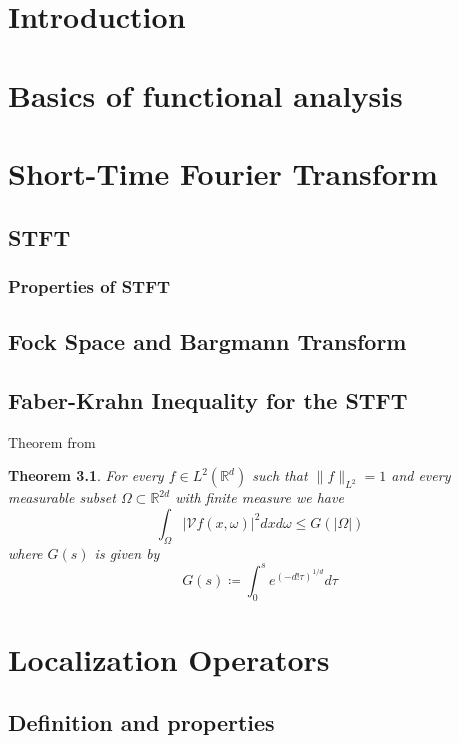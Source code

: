 \documentclass[corpo=11pt, stile=classica, tipotesi=custom,
greek, evenboxes, english]{toptesi}
\numberwithin{equation}{chapter}
\newtheorem{teo}{Theorem}[chapter] %
\newcommand{\R}{\mathbb{R}} %
\newcommand{\V}{\mathcal{V}} %
\newcommand{\dxdo}{dxd\omega}
\begin{document}
	


\tableofcontents

\sommario

\chapter{Introduction}

\chapter{Basics of functional analysis}

\chapter{Short-Time Fourier Transform}
\section{STFT}
\subsection{Properties of STFT}
\section{Fock Space and Bargmann Transform}
\section{Faber-Krahn Inequality for the STFT}

Theorem from \cite{nicolatilli_fk}
\begin{teo}\label{faberkrahn}
	For every $f \in L^2(\R^d)$ such that $\|f\|_{L^2} = 1$ and every measurable subset $\Omega \subset \R^{2d}$ with finite measure we have
	\begin{equation*}
		\int_{\Omega}  |\V f(x,\omega)|^2 \dxdo \leq G(|\Omega|)
	\end{equation*}
	where $G(s)$ is given by
	\begin{equation}\label{G}
		G(s) \coloneqq \int_0^s e^{\left(-d!\tau\right)^{1/d}} d\tau
	\end{equation}
\end{teo}


\chapter{Localization Operators}
\section{Definition and properties}
\end{document}
